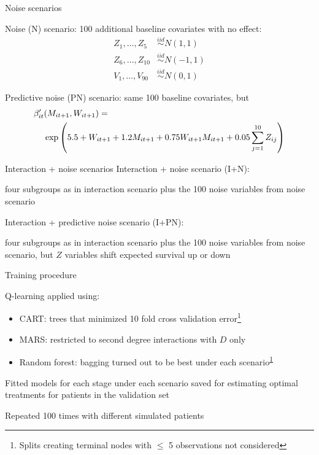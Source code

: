 \documentclass{beamer}
\begin{document}
\begin{frame}[c]{Noise scenarios}
  
  Noise (N) scenario: 100 additional baseline covariates with no effect:
  \begin{align*}
    Z_{1}, \ldots, Z_{5} &\overset{iid}{\sim} N(1, 1) \\
    Z_{6}, \ldots, Z_{10} &\overset{iid}{\sim} N(-1, 1) \\
    V_{1}, \ldots, V_{90} &\overset{iid}{\sim} N(0, 1)
  \end{align*}
  
  Predictive noise (PN) scenario: same 100 baseline covariates, but
  \begin{align*}
    \beta'_{it}&(M_{it+1}, W_{it+1}) = \\
    &\exp\del{5.5 + W_{it+1} + 1.2 M_{it+1} + 0.75 W_{it+1} M_{it+1} + 0.05 \sum_{j = 1}^{10} Z_{ij}}
  \end{align*}
\end{frame}

\begin{frame}[c]{Interaction + noise scenarios}
  Interaction + noise scenario (I+N):
  
  four subgroups as in interaction scenario plus the 100 noise variables from noise scenario
  
  \bigskip
  
  Interaction + predictive noise scenario (I+PN):
  
  four subgroups as in interaction scenario plus the 100 noise variables from noise scenario, but $Z$ variables shift expected survival up or down
\end{frame}


\begin{frame}[c]{Training procedure}
  
  Q-learning applied using:
  \begin{itemize}
    \item CART: trees that minimized 10 fold cross validation error\footnote{\label{tree} Splits creating terminal nodes with $\leq$ 5 observations not considered}
    \item MARS: restricted to second degree interactions with $D$ only
    \item Random forest: bagging turned out to be best under each scenario\textsuperscript{\ref{tree}}
  \end{itemize}
  
  Fitted models for each stage under each scenario saved for estimating optimal treatments for patients in the validation set
  
  Repeated 100 times with different simulated patients
\end{frame}
\end{document}
